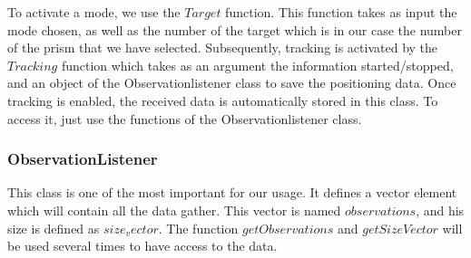 \documentclass[10pt,letterpaper,oneside]{article}
\begin{document}

To activate a mode, we use the $Target$ function.
This function takes as input the mode chosen, as well as the number of the target which is in our case the number of the prism that we have selected.
Subsequently, tracking is activated by the $Tracking$ function which takes as an argument the information started/stopped, and an object of the Observationlistener class to save the positioning data.
Once tracking is enabled, the received data is automatically stored in this class.
To access it, just use the functions of the Observationlistener class.


\subsubsection{ObservationListener}

This class is one of the most important for our usage.
It defines a vector element which will contain all the data gather.
This vector is named $observations$, and his size is defined as $size_vector$.
The function $getObservations$ and $getSizeVector$ will be used several times to have access to the data.
\end{document}
